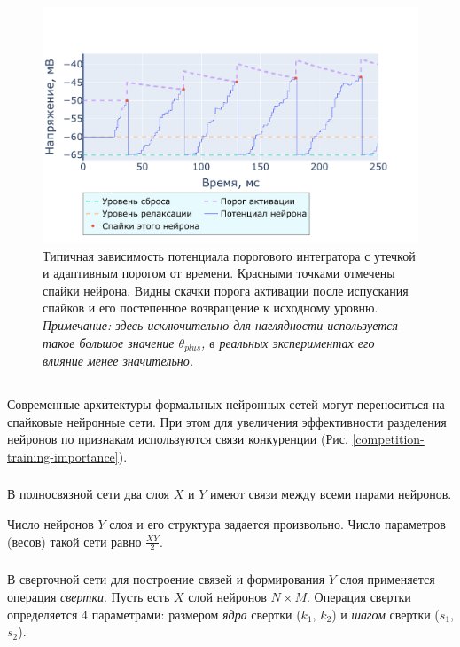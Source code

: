 \documentclass[a4paper]{article}
\begin{document}
\begin{center}
\begin{figure}[H]
 \includegraphics[width=\textwidth,keepaspectratio=true]{model_alif_ru.pdf}
 \caption{Типичная зависимость потенциала порогового интегратора с утечкой и адаптивным порогом от времени. Красными точками отмечены спайки нейрона. Видны скачки порога активации после испускания спайков и его постепенное возвращение к исходному уровню.\\
 \textit{Примечание: здесь исключительно для наглядности используется такое большое значение $\theta_{plus}$, в реальных экспериментах его влияние менее значительно.}}
\end{figure} 
\end{center}

\subsection{}
Современные архитектуры формальных нейронных сетей могут переноситься на спайковые нейронные сети. При этом для увеличения эффективности разделения нейронов по признакам используются связи конкуренции (Рис. \ref{competition-training-importance}). 

\subsubsection{}
В полносвязной сети два слоя $X$ и $Y$ имеют связи между всеми парами нейронов.

Число нейронов $Y$ слоя и его структура задается произвольно. Число параметров (весов) такой сети равно $\frac{XY}{2}$.

\subsubsection{}
В сверточной сети для построение связей и формирования $Y$ слоя применяется операция \textit{свертки}. Пусть есть $X$ слой нейронов $N \times M$. Операция свертки определяется 4 параметрами: размером \textit{ядра} свертки ($k_1$, $k_2$) и \textit{шагом} свертки ($s_1$, $s_2$).
\end{document}
